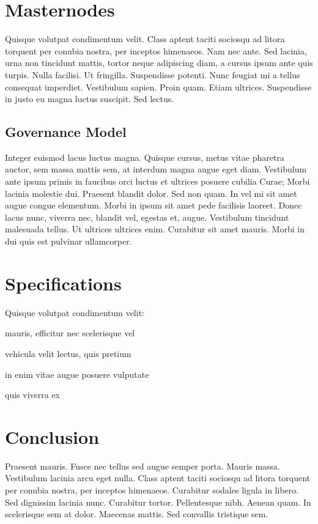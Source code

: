 \documentclass[peerreview]{ieeesyscoin}
\begin{document}
\section{Masternodes}
\label{sec:protocol}

Quisque volutpat condimentum velit. Class aptent taciti sociosqu ad litora torquent per conubia nostra, per inceptos himenaeos. Nam nec ante. Sed lacinia, urna non tincidunt mattis, tortor neque adipiscing diam, a cursus ipsum ante quis turpis. Nulla facilisi. Ut fringilla. Suspendisse potenti. Nunc feugiat mi a tellus consequat imperdiet. Vestibulum sapien. Proin quam. Etiam ultrices. Suspendisse in justo eu magna luctus suscipit. Sed lectus. 

\subsection{Governance Model}
Integer euismod lacus luctus magna. Quisque cursus, metus vitae pharetra auctor, sem massa mattis sem, at interdum magna augue eget diam. Vestibulum ante ipsum primis in faucibus orci luctus et ultrices posuere cubilia Curae; Morbi lacinia molestie dui. Praesent blandit dolor. Sed non quam. In vel mi sit amet augue congue elementum. Morbi in ipsum sit amet pede facilisis laoreet. Donec lacus nunc, viverra nec, blandit vel, egestas et, augue. Vestibulum tincidunt malesuada tellus. Ut ultrices ultrices enim. Curabitur sit amet mauris. Morbi in dui quis est pulvinar ullamcorper. 




\section{Specifications}
\label{sec:specs}

Quisque volutpat condimentum velit:

\begin{description}[font=$\bullet$~\normalfont\scshape\color{blue!50!black}]
\item [Maecenas dolor] mauris, efficitur nec scelerisque vel
\item [Curabitur] vehicula velit lectus, quis pretium
\item [Quisque] in enim vitae augue posuere vulputate
\item [Praesent] quis viverra ex
\end{description}


\section{Conclusion}
Praesent mauris. Fusce nec tellus sed augue semper porta. Mauris massa. Vestibulum lacinia arcu eget nulla. Class aptent taciti sociosqu ad litora torquent per conubia nostra, per inceptos himenaeos. Curabitur sodales ligula in libero. Sed dignissim lacinia nunc. Curabitur tortor. Pellentesque nibh. Aenean quam. In scelerisque sem at dolor. Maecenas mattis. Sed convallis tristique sem. 
\end{document}
